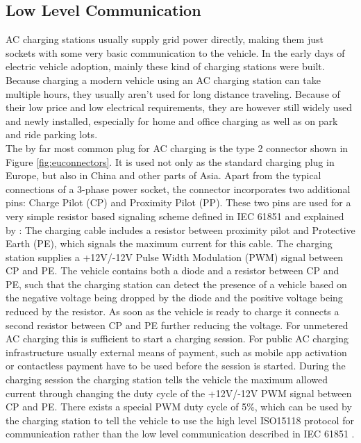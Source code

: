 \documentclass[conference,flushend]{iaria} %
\begin{document}
\subsection{Low Level Communication}
AC charging stations usually supply grid power directly, making them just sockets with some very basic communication to the vehicle.
In the early days of electric vehicle adoption, mainly these kind of charging stations were built.
Because charging a modern vehicle using an AC charging station can take multiple hours, they usually aren't used for long distance traveling.
Because of their low price and low electrical requirements, they are however still widely used and newly installed, especially for home and office charging as well as on park and ride parking lots. \\
The by far most common plug for AC charging is the type 2 connector shown in Figure \ref{fig:euconnectors}. It is used not only as the standard charging plug in Europe, but also in China and other parts of Asia.
Apart from the typical connections of a 3-phase power socket, the connector incorporates two additional pins: Charge Pilot (CP) and Proximity Pilot (PP).
These two pins are used for a very simple resistor based signaling scheme defined in IEC 61851 \cite{iec_iec_2010} and explained by \cite{dalheimer_ladeinfrastruktur_2017}:
The charging cable includes a resistor between proximity pilot and Protective Earth (PE), which signals the maximum current for this cable.
The charging station supplies a +12V/-12V Pulse Width Modulation (PWM) signal between CP and PE.
The vehicle contains both a diode and a resistor between CP and PE, such that the charging station can detect the presence of a vehicle based on the negative voltage being dropped by the diode and the positive voltage being reduced by the resistor.
As soon as the vehicle is ready to charge it connects a second resistor between CP and PE further reducing the voltage.
For unmetered AC charging this is sufficient to start a charging session.
For public AC charging infrastructure usually external means of payment, such as mobile app activation or contactless payment have to be used before the session is started.
During the charging session the charging station tells the vehicle the maximum allowed current through changing the duty cycle of the +12V/-12V PWM signal between CP and PE.
There exists a special PWM duty cycle of 5\%, which can be used by the charging station to tell the vehicle to use the high level ISO15118 protocol for communication rather than the low level communication described in IEC 61851 \cite{iec_iec_2010}.
\end{document}
